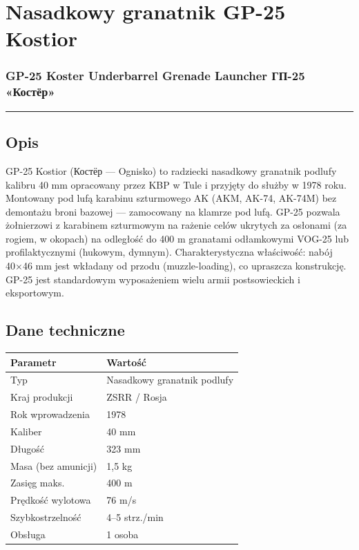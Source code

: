 \documentclass[12pt,openany,oneside]{book}
\begin{document}
\chapter{Nasadkowy granatnik GP-25
Kostior}\label{nasadkowy-granatnik-gp-25-kostior}

\subsection{GP-25 Koster Underbarrel Grenade Launcher \textbar{} ГП-25
«Костёр»}\label{gp-25-koster-underbarrel-grenade-launcher-ux433ux43f-25-ux43aux43eux441ux442ux451ux440}

\begin{center}\rule{0.5\linewidth}{0.5pt}\end{center}

\section{Opis}\label{opis-79}

GP-25 Kostior (Костёр --- Ognisko) to radziecki nasadkowy granatnik
podlufy kalibru 40 mm opracowany przez KBP w Tule i przyjęty do służby w
1978 roku. Montowany pod lufą karabinu szturmowego AK (AKM, AK-74,
AK-74M) bez demontażu broni bazowej --- zamocowany na klamrze pod lufą.
GP-25 pozwala żołnierzowi z karabinem szturmowym na rażenie celów
ukrytych za osłonami (za rogiem, w okopach) na odległość do 400 m
granatami odłamkowymi VOG-25 lub profilaktycznymi (hukowym, dymnym).
Charakterystyczna właściwość: nabój 40×46 mm jest wkładany od przodu
(muzzle-loading), co upraszcza konstrukcję. GP-25 jest standardowym
wyposażeniem wielu armii postsowieckich i eksportowym.

\section{Dane techniczne}\label{dane-techniczne-79}

\begin{longtable}[]{@{}ll@{}}
\toprule\noalign{}
Parametr & Wartość \\
\midrule\noalign{}
\endhead
\bottomrule\noalign{}
\endlastfoot
Typ & Nasadkowy granatnik podlufy \\
Kraj produkcji & ZSRR / Rosja \\
Rok wprowadzenia & 1978 \\
Kaliber & 40 mm \\
Długość & 323 mm \\
Masa (bez amunicji) & 1,5 kg \\
Zasięg maks. & 400 m \\
Prędkość wylotowa & 76 m/s \\
Szybkostrzelność & 4--5 strz./min \\
Obsługa & 1 osoba \\
\end{longtable}
\end{document}
